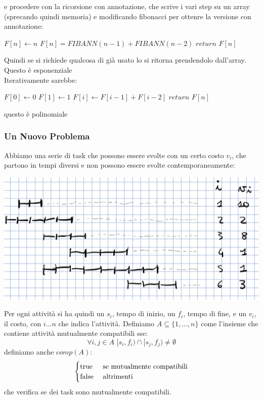 \documentclass[a4paper,12pt, oneside]{book}
\begin{document}
e procedere con la ricorsione con annotazione, che scrive i vari step
su un array (sprecando quindi memoria) e modificando fibonacci per
ottenre la versione con annotazione:
\begin{algorithm}
  \begin{algorithmic}
    \State $F[n]\gets n$
    \Else
    \State $F[n]=FIBANN(n-1)+FIBANN(n-2)$
    \EndIf
    \State $return\,\,F[n]$
    \EndIf
    \EndFunction
  \end{algorithmic}
\end{algorithm}
Quindi se si richiede qualcosa di già usato lo si ritorna prendendolo
dall'array. Questo è esponenziale\\
Iterativamente sarebbe:
\begin{algorithm}
  \begin{algorithmic}
    \State $F[0] \gets 0$
    \State $F[1] \gets 1$
    \State $F[i] \gets F[i-1]+F[i-2]$
    \EndFor
    \State $return\,\,F[n]$
    \EndFunction
  \end{algorithmic}
\end{algorithm}
questo è polinomiale
\subsubsection{Un Nuovo Problema}
Abbiamo una serie di task che possono essere svolte con un certo costo
$v_i$, che partono in tempi diversi e non possono essere svolte
contemporaneamente:
\begin{center}
  \includegraphics[scale = 0.7]{img/ta.png}
\end{center}
Per ogni attività si ha quindi un $s_i$, tempo di inizio, un $f_i$,
tempo di fine, e un $v_i$, il costo, con $i\ldots n$ che indica
l'attività. Definiamo $A\subseteq\{1,\ldots, n\}$ come l'insieme che
contiene attività mutualmente compatibili sse:
\[\forall i,j\in A\,\, [s_i,f_i)\cap [s_j,f_j)\neq \emptyset\]
definiamo anche $comp(A)$:
\[
  \begin{cases}
    $true$ & \mbox{ se mutualmente compatibili}\\
    $false$ & \mbox{ altrimenti}
  \end{cases}
\]
che verifica se dei task sono mutualmente compatibili.\\
\end{document}
